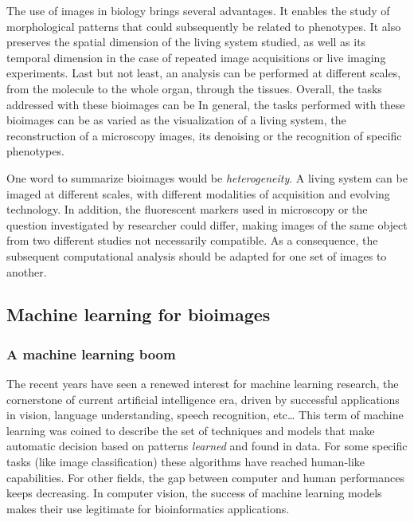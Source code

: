 The use of images in biology brings several advantages.
It enables the study of morphological patterns that could subsequently be related to phenotypes.
It also preserves the spatial dimension of the living system studied, as well as its temporal dimension in the case of repeated image acquisitions or live imaging experiments.
Last but not least, an analysis can be performed at different scales, from the molecule to the whole organ, through the tissues.
Overall, the tasks addressed with these bioimages can be
In general, the tasks performed with these bioimages can be as varied as the visualization of a living system, the reconstruction of a microscopy images, its denoising or the recognition of specific phenotypes.

One word to summarize bioimages would be \emph{heterogeneity}.
A living system can be imaged at different scales, with different modalities of acquisition and evolving technology.
In addition, the fluorescent markers used in microscopy or the question investigated by researcher could differ, making images of the same object from two different studies not necessarily compatible.
As a consequence, the subsequent computational analysis should be adapted for one set of images to another.

\subsection{Machine learning for bioimages}
\label{subsec:intro_ml_tools}

\subsubsection{A machine learning boom}

The recent years have seen a renewed interest for machine learning research, the cornerstone of current artificial intelligence era, driven by successful applications in vision, language understanding, speech recognition, etc\dots
This term of machine learning was coined to describe the set of techniques and models that make automatic decision based on patterns \emph{learned} and found in data.
For some specific tasks (like image classification) these algorithms have reached human-like capabilities.
For other fields, the gap between computer and human performances keeps decreasing.
In computer vision, the success of machine learning models makes their use legitimate for bioinformatics applications.\\

